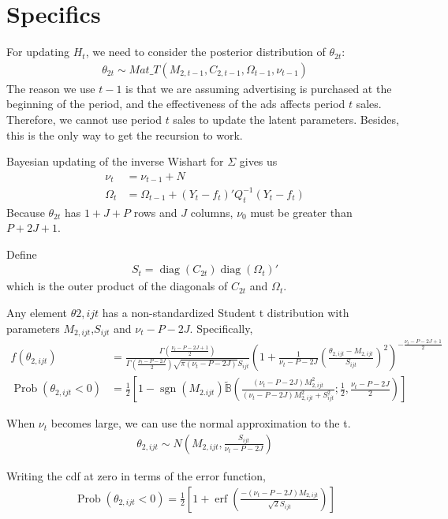 \documentclass[letter,11pt]{article}
\DeclareMathOperator\sgn{sgn}
\DeclareMathOperator\Prob{Prob}
\DeclareMathOperator\diag{diag}
\DeclareMathOperator\erf{erf}
\begin{document}
\section{Specifics}

For updating $H_t$, we need to consider the posterior distribution of
$\theta_{2t}$:
\begin{align}
  \label{eq:10}
  \theta_{2t}\sim Mat\_T(M_{2,t-1},C_{2,t-1},\Omega_{t-1},\nu_{t-1})
\end{align}
The reason we use $t-1$ is that we are assuming advertising is
purchased at the beginning of the period, and the effectiveness of the
ads affects period $t$ sales.  Therefore, we cannot use period $t$
sales to update the latent parameters.  Besides, this is the only way
to get the recursion to work.

Bayesian updating of the inverse Wishart for $\Sigma$ gives us
\begin{align}
  \label{eq:11}
  \nu_t&=\nu_{t-1}+N\\
\Omega_t&=\Omega_{t-1}+(Y_t-f_t)'Q_t^{-1}(Y_t-f_t)
\end{align}
Because $\theta_{2t}$ has $1+J+P$ rows and $J$ columns, $\nu_0$ must
be greater than $P+2J+1$.  

Define
\begin{align}
  \label{eq:13}
S_t=\diag(C_{2t})\diag(\Omega_t)'
\end{align}
which is the outer product of the diagonals of
$C_{2t}$ and $\Omega_t$.

Any element $\theta{2,ijt}$ has a non-standardized Student t
distribution with parameters $M_{2,ijt}$,$S_{ijt}$ and $\nu_t-P-2J$.  Specifically,
\begin{align}
  \label{eq:14}
  f(\theta_{2,ijt})&=\frac{\Gamma\left(\frac{\nu_t-P-2J+1}{2}\right)}{\Gamma\left(\frac{\nu_t-P-2J}{2}\right)\sqrt{\pi
      (\nu_t-P-2J)} S_{ijt}}
\left(1+\frac{1}{\nu_t-P-2J}\left(\frac{\theta_{2,ijt}-M_{2,ijt}}{S_{ijt}}\right)^2\right)^{-\frac{\nu_t-P-2J+1}{2}}\\
\Prob(\theta_{2,ijt}<0)&=\frac{1}{2}\left[1-\sgn(M_{2.ijt})\widetilde{\mathbb{B}}\left(\frac{\left(\nu_t-P-2J\right)M_{2,ijt}^2}{\left(\nu_t-P-2J\right)M_{2,ijt}^2+S_{ijt}^2};\frac{1}{2},\frac{\nu_t-P-2J}{2}\right)\right]
\end{align}

When $\nu_t$ becomes large, we can use the normal approximation to the t.
\begin{align}
  \label{eq:15}
  \theta_{2,ijt}\sim N\left(M_{2,ijt},\frac{S_{ijt}}{\nu_t-P-2J}\right)
\end{align}

Writing the cdf at zero in terms of the error function,
\begin{align}
  \label{eq:16}
  \Prob(\theta_{2,ijt}<0)=\frac{1}{2}\left[1+\erf\left(\frac{-\left(\nu_t-P-2J\right)M_{2,ijt}}{\sqrt{2}S_{ijt}}\right)\right]
\end{align}





\printbibliography
\end{document}
